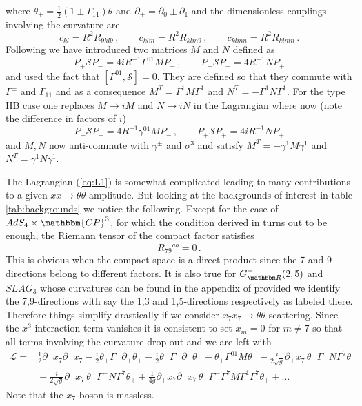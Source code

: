 \documentclass[a4paper,11pt]{article}
\begin{document}
where $\theta_\pm=\frac12(1\pm\Gamma_{11})\theta$ and $\partial_\pm=\partial_0\pm\partial_1$ and the dimensionless couplings involving the curvature are
\begin{equation}
c_{kl}=R^2R_{9kl9}\,,\qquad
c_{klm}=R^2R_{klm9}\,,\qquad
c_{klmn}=R^2R_{klmn}\,.
\end{equation}
Following \cite{Wulff:2017lxh} we have introduced two matrices $M$ and $N$ defined as
\begin{equation}
P_+\mathcal SP_-=4iR^{-1}\Gamma^{01}MP_-\,,\qquad P_+\mathcal SP_+=4R^{-1}NP_+
\label{eq:MN-IIA}
\end{equation} 
and used the fact that $[\Gamma^{01},\mathcal S]=0$. They are defined so that they commute with $\Gamma^\pm$ and $\Gamma_{11}$ and as a consequence $M^T=\Gamma^1M\Gamma^1$ and $N^T=-\Gamma^1N\Gamma^1$. For the type IIB case one replaces $M\rightarrow iM$ and $N\rightarrow iN$ in the Lagrangian where now (note the difference in factors of $i$)
\begin{equation}
P_+\mathcal SP_-=4R^{-1}\gamma^{01}MP_-\,,\qquad P_+\mathcal SP_+=4iR^{-1}NP_+
\label{eq:MN-IIB}
\end{equation} 
and $M,N$ now anti-commute with $\gamma^\pm$ and $\sigma^3$ and satisfy $M^T=-\gamma^1M\gamma^1$ and $N^T=\gamma^1N\gamma^1$.

The Lagrangian (\ref{eq:L1}) is somewhat complicated leading to many contributions to a given $xx\rightarrow\theta\theta$ amplitude. But looking at the backgrounds of interest in table \ref{tab:backgrounds} we notice the following. Except for the case of $AdS_4\times\mathbbm{CP}^3$, for which the condition derived in \cite{Wulff:2017lxh} turns out to be enough, the Riemann tensor of the compact factor satisfies
\begin{equation}
R_{79}{}^{ab}=0\,.
\end{equation}
This is obvious when the compact space is a direct product since the 7 and 9 directions belong to different factors. It is also true for $G_{\mathbbm R}^+(2,5)$ and $SLAG_3$ whose curvatures can be found in the appendix of \cite{Wulff:2017zbl} provided we identify the 7,9-directions with say the 1,3 and 1,5-directions respectively as labeled there. Therefore things simplify drastically if we consider $x_7x_7\rightarrow\theta\theta$ scattering. Since the $x^3$ interaction term vanishes it is consistent to set $x_m=0$ for $m\neq7$ so that all terms involving the curvature drop out and we are left with
\begin{align}
\mathcal L=&
\tfrac12\partial_+x_7\partial_-x_7
-\tfrac{i}{2}\theta_+\Gamma^-\partial_+\theta_+
-\tfrac{i}{2}\theta_-\Gamma^-\partial_-\theta_-
-\theta_+\Gamma^{01}M\theta_-
-\tfrac{i}{2\sqrt g}\partial_+x_7\,\theta_+\Gamma^-N\Gamma^7\theta_-
\nonumber\\
&{}
-\tfrac{i}{2\sqrt g}\partial_-x_7\,\theta_-\Gamma^-N\Gamma^7\theta_+
+\tfrac{1}{4g}\partial_+x_7\partial_-x_7\,\theta_-\Gamma^-\Gamma^7M\Gamma^1\Gamma^7\theta_+
+\ldots
\label{eq:L-x7}
\end{align}
Note that the $x_7$ boson is massless.
 
\end{document}
